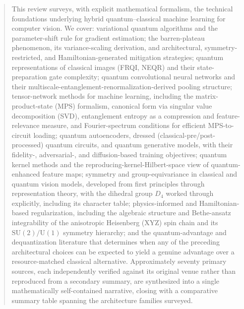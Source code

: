\documentclass[11pt]{article}
\begin{document}
\begin{abstract}
This review surveys, with explicit mathematical formalism, the technical foundations underlying hybrid quantum--classical machine learning for computer vision. We cover: variational quantum algorithms and the parameter-shift rule for gradient estimation; the barren-plateau phenomenon, its variance-scaling derivation, and architectural, symmetry-restricted, and Hamiltonian-generated mitigation strategies; quantum representations of classical images (FRQI, NEQR) and their state-preparation gate complexity; quantum convolutional neural networks and their multiscale-entanglement-renormalization-derived pooling structure; tensor-network methods for machine learning, including the matrix-product-state (MPS) formalism, canonical form via singular value decomposition (SVD), entanglement entropy as a compression and feature-relevance measure, and Fourier-spectrum conditions for efficient MPS-to-circuit loading; quantum autoencoders, dressed (classical-pre/post-processed) quantum circuits, and quantum generative models, with their fidelity-, adversarial-, and diffusion-based training objectives; quantum kernel methods and the reproducing-kernel-Hilbert-space view of quantum-enhanced feature maps; symmetry and group-equivariance in classical and quantum vision models, developed from first principles through representation theory, with the dihedral group $D_4$ worked through explicitly, including its character table; physics-informed and Hamiltonian-based regularization, including the algebraic structure and Bethe-ansatz integrability of the anisotropic Heisenberg (XYZ) spin chain and its $\mathrm{SU}(2)/\mathrm{U}(1)$ symmetry hierarchy; and the quantum-advantage and dequantization literature that determines when any of the preceding architectural choices can be expected to yield a genuine advantage over a resource-matched classical alternative. Approximately seventy primary sources, each independently verified against its original venue rather than reproduced from a secondary summary, are synthesized into a single mathematically self-contained narrative, closing with a comparative summary table spanning the architecture families surveyed.
\end{abstract}
\end{document}
